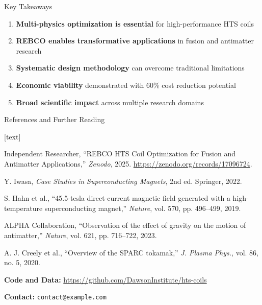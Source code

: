 \documentclass[aspectratio=169,xcolor={table,dvipsnames}]{beamer}
\makeatletter
\providecommand{\authorname}{Independent Researcher}%
\providecommand{\authoremail}{contact@example.com}%
\makeatother
\begin{document}
\begin{frame}{Key Takeaways}
    \begin{enumerate}
        \item \textbf{Multi-physics optimization is essential} for high-performance HTS coils
        \item \textbf{REBCO enables transformative applications} in fusion and antimatter research
        \item \textbf{Systematic design methodology} can overcome traditional limitations
        \item \textbf{Economic viability} demonstrated with 60\% cost reduction potential
        \item \textbf{Broad scientific impact} across multiple research domains
    \end{enumerate}
    
    \vspace{0.5cm}
    \begin{center}
    \end{center}
\end{frame}

\begin{frame}{References and Further Reading}
    \begin{thebibliography}{10}
        [text]
        
     {\authorname}, ``REBCO HTS Coil Optimization for Fusion and Antimatter Applications,'' \textit{Zenodo}, 2025. \url{https://zenodo.org/records/17096724}.
        
         Y. Iwasa, \textit{Case Studies in Superconducting Magnets}, 2nd ed. Springer, 2022.
        
         S. Hahn et al., ``45.5-tesla direct-current magnetic field generated with a high-temperature superconducting magnet,'' \textit{Nature}, vol. 570, pp. 496--499, 2019.
        
         ALPHA Collaboration, ``Observation of the effect of gravity on the motion of antimatter,'' \textit{Nature}, vol. 621, pp. 716--722, 2023.
        
         A. J. Creely et al., ``Overview of the SPARC tokamak,'' \textit{J. Plasma Phys.}, vol. 86, no. 5, 2020.
        
    \end{thebibliography}
    
    \vspace{0.5cm}
    \textbf{Code and Data:} \url{https://github.com/DawsonInstitute/hts-coils}
    
    \textbf{Contact:} {\texttt{\authoremail}}
\end{frame}
\end{document}
